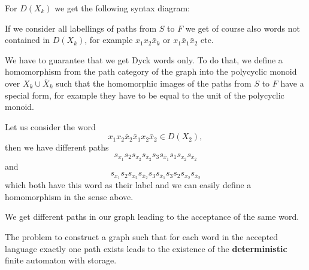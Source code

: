 For $D(X_k)$ we get the following syntax diagram:

\begin{center}
\end{center}

If we consider all labellings of paths from $S$ to $F$ we get of course also
words not contained in $D(X_k)$, for example $x_1 x_2 \bar{x}_k$ or $x_1
\bar{x}_1 \bar{x}_2$ etc.

We have to guarantee that we get Dyck words only. To do that, we define a
homomorphism from the path category of the graph into the polycyclic monoid over
$X_k \cup \bar{X}_k$ such that the homomorphic images of the paths from $S$ to
$F$ have a special form, for example they have to be equal to the unit of the
polycyclic monoid.

Let us consider the word
\[ x_1 x_2 \bar{x}_2 \bar{x}_1 x_2 \bar{x}_2 \in D(X_2), \]
then we have different paths
\[s_{x_1} s_2 s_{x_2} s_{\bar{x}_2} s_3 s_{\bar{x}_1} s_1
s_{x_2} s_{\bar{x}_2} \] 
and 
\[s_{x_1} s_2 s_{x_2} s_{\bar{x}_2} s_3
s_{\bar{x}_1} s_3 s_2 s_{x_2} s_{\bar{x}_2}\]
which both have this word as their label and we can easily define a
homomorphism in the sense above.

We get different paths in our graph leading to the acceptance of the same word.

The problem to construct a graph such that for each word in the accepted
language exactly one path exists leads to the existence of the {\bf
deterministic} finite automaton with storage.

